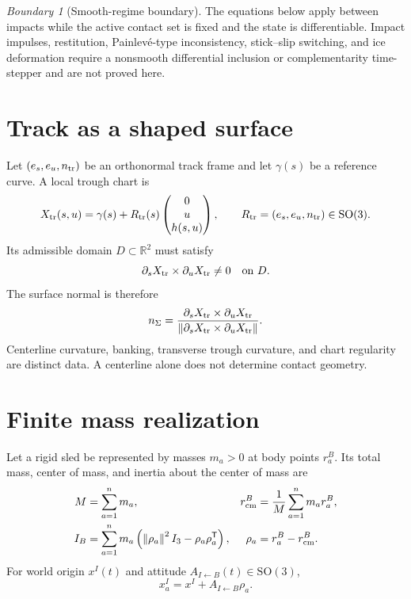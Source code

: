 \documentclass[11pt,a4paper]{article}
\theoremstyle{definition}
\theoremstyle{plain}
\theoremstyle{remark}
\newtheorem{warning}[definition]{Boundary}
\newcommand{\R}{\mathbb{R}}
\newcommand{\norm}[1]{\left\lVert #1\right\rVert}
\newcommand{\SO}{\mathrm{SO}}
\begin{document}
\begin{warning}[Smooth-regime boundary]
The equations below apply between impacts while the active contact set
is fixed and the state is differentiable. Impact impulses,
restitution, Painlev\'e-type inconsistency, stick--slip switching, and
ice deformation require a nonsmooth differential inclusion or
complementarity time-stepper and are not proved here.
\end{warning}

\section{Track as a shaped surface}

Let \((e_s,e_u,n_{\rm tr})\) be an orthonormal track frame and let
\(\gamma(s)\) be a reference curve. A local trough chart is
\begin{equation}\label{eq:surface}
X_{\rm tr}(s,u)
=\gamma(s)+R_{\rm tr}(s)
\begin{pmatrix}0\\u\\h(s,u)\end{pmatrix},
\qquad R_{\rm tr}=(e_s,e_u,n_{\rm tr})\in\SO(3).
\end{equation}
Its admissible domain \(D\subset\R^2\) must satisfy
\begin{equation}\label{eq:surface-regular}
\partial_sX_{\rm tr}\times\partial_uX_{\rm tr}\ne0
\quad\text{on }D.
\end{equation}
The surface normal is therefore
\[
n_\Sigma
=\frac{\partial_sX_{\rm tr}\times\partial_uX_{\rm tr}}
{\norm{\partial_sX_{\rm tr}\times\partial_uX_{\rm tr}}}.
\]
Centerline curvature, banking, transverse trough curvature, and chart
regularity are distinct data. A centerline alone does not determine
contact geometry.

\section{Finite mass realization}

Let a rigid sled be represented by masses \(m_a>0\) at body points
\(r_a^B\). Its total mass, center of mass, and inertia about the center
of mass are
\begin{align}
M&=\sum_{a=1}^nm_a,&
r_{\rm cm}^B&=\frac1M\sum_{a=1}^nm_ar_a^B,\\
I_B&=\sum_{a=1}^nm_a
\left(
\norm{\rho_a}^2I_3-\rho_a\rho_a^{\mathsf T}
\right),&
\rho_a&=r_a^B-r_{\rm cm}^B .
\end{align}
For world origin \(x^I(t)\) and attitude
\(A_{I\leftarrow B}(t)\in\SO(3)\),
\[
x_a^I=x^I+A_{I\leftarrow B}\rho_a.
\]
\end{document}
